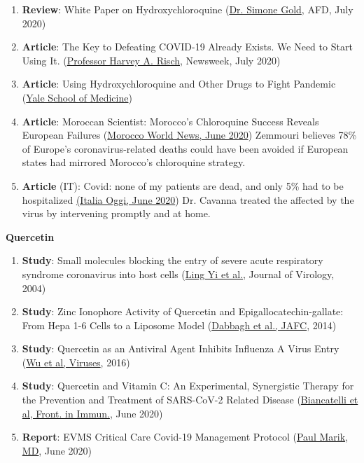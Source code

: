 \begin{enumerate}
{  Council of Medical Research}, March 2020)
\item
  \textbf{Review}: White Paper on Hydroxychloroquine
  (\href{https://swprs.files.wordpress.com/2020/07/hcq-white-paper-dr-simone-gold.pdf}{Dr.
  Simone Gold}, AFD, July 2020)
\item
  \textbf{Article}: The Key to Defeating COVID-19 Already Exists. We
  Need to Start Using It.
  (\href{https://www.newsweek.com/key-defeating-covid-19-already-exists-we-need-start-using-it-opinion-1519535}{Professor
  Harvey A. Risch}, Newsweek, July 2020)
\item
  \textbf{Article}: Using Hydroxychloroquine and Other Drugs to Fight
  Pandemic (\href{https://medicine.yale.edu/news-article/25085/}{Yale
  School of Medicine})
\item
  \textbf{Article}: Moroccan Scientist: Morocco's Chloroquine Success
  Reveals European Failures
  (\href{https://www.moroccoworldnews.com/2020/06/306587/moroccan-scientist-moroccos-chloroquine-success-reveals-european-failures/}{Morocco
  World News, June 2020}) Zemmouri believes 78\% of Europe's
  coronavirus-related deaths could have been avoided if European states
  had mirrored Morocco's chloroquine strategy.
\item
  \textbf{Article} (IT): Covid: none of my patients are dead, and only
  5\% had to be hospitalized
  \href{https://www.italiaoggi.it/news/covid-nessuno-dei-miei-e-morto-2454154}{(Italia
  Oggi, June 2020}) Dr. Cavanna treated the affected by the virus by
  intervening promptly and at home.
\end{enumerate}

\textbf{Quercetin}

\begin{enumerate}
\def\labelenumi{\arabic{enumi}.}
\tightlist
\item
  \textbf{Study}: Small molecules blocking the entry of severe acute
  respiratory syndrome coronavirus into host cells
  (\href{https://jvi.asm.org/content/78/20/11334.long}{Ling Yi et al.},
  Journal of Virology, 2004)
\item
  \textbf{Study}: Zinc Ionophore Activity of Quercetin and
  Epigallocatechin-gallate: From Hepa 1-6 Cells to a Liposome Model
  (\href{https://pubs.acs.org/doi/10.1021/jf5014633}{Dabbagh et al.,
  JAFC}, 2014)
\item
  \textbf{Study}: Quercetin as an Antiviral Agent Inhibits Influenza A
  Virus Entry
  (\href{https://www.ncbi.nlm.nih.gov/pmc/articles/PMC4728566/}{Wu et
  al, Viruses}, 2016)
\item
  \textbf{Study}: Quercetin and Vitamin C: An Experimental, Synergistic
  Therapy for the Prevention and Treatment of SARS-CoV-2 Related Disease
  (\href{https://www.frontiersin.org/articles/10.3389/fimmu.2020.01451/full}{Biancatelli
  et al, Front. in Immun.}, June 2020)
\item
  \textbf{Report}: EVMS Critical Care Covid-19 Management Protocol
  (\href{https://www.evms.edu/media/evms_public/departments/internal_medicine/EVMS_Critical_Care_COVID-19_Protocol.pdf}{Paul
  Marik, MD}, June 2020)
\end{enumerate}

